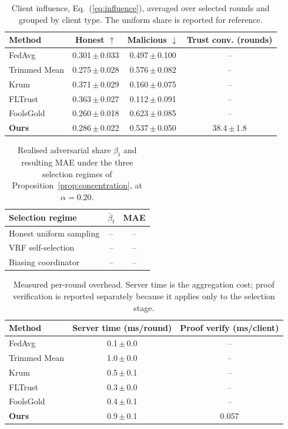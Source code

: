 \begin{table}[t]
\centering
\scriptsize
\caption{Client influence, Eq.~(\ref{eq:influence}), averaged over selected rounds and grouped by client type. The uniform share is reported for reference.}
\label{tab:trust_influence}
\setlength{\tabcolsep}{6pt}
\begin{tabular}{lccc}
\toprule
\textbf{Method} & \textbf{Honest $\uparrow$} & \textbf{Malicious $\downarrow$} & \textbf{Trust conv. (rounds)} \\
\midrule
FedAvg & 0.301\,$\pm$\,0.033 & 0.497\,$\pm$\,0.100 & -- \\
Trimmed Mean & 0.275\,$\pm$\,0.028 & 0.576\,$\pm$\,0.082 & -- \\
Krum & 0.371\,$\pm$\,0.029 & 0.160\,$\pm$\,0.075 & -- \\
FLTrust & 0.363\,$\pm$\,0.027 & 0.112\,$\pm$\,0.091 & -- \\
FoolsGold & 0.260\,$\pm$\,0.018 & 0.623\,$\pm$\,0.085 & -- \\
\textbf{Ours} & 0.286\,$\pm$\,0.022 & 0.537\,$\pm$\,0.050 & 38.4\,$\pm$\,1.8 \\
\bottomrule
\end{tabular}
\end{table}

\begin{table}[t]
\centering
\scriptsize
\caption{Realised adversarial share $\beta_t$ and resulting MAE under the three selection regimes of Proposition~\ref{prop:concentration}, at $\alpha=0.20$.}
\label{tab:selection}
\begin{tabular}{lcc}
\toprule
\textbf{Selection regime} & $\bar{\beta}_t$ & \textbf{MAE} \\
\midrule
Honest uniform sampling & -- & -- \\
VRF self-selection & -- & -- \\
Biasing coordinator & -- & -- \\
\bottomrule
\end{tabular}
\end{table}

\begin{table}[t]
\centering
\scriptsize
\caption{Measured per-round overhead. Server time is the aggregation cost; proof verification is reported separately because it applies only to the selection stage.}
\label{tab:overhead}
\setlength{\tabcolsep}{4pt}
\begin{tabular}{lcc}
\toprule
\textbf{Method} & \textbf{Server time (ms/round)} & \textbf{Proof verify (ms/client)} \\
\midrule
FedAvg & 0.1\,$\pm$\,0.0 & -- \\
Trimmed Mean & 1.0\,$\pm$\,0.0 & -- \\
Krum & 0.5\,$\pm$\,0.1 & -- \\
FLTrust & 0.3\,$\pm$\,0.0 & -- \\
FoolsGold & 0.4\,$\pm$\,0.1 & -- \\
\textbf{Ours} & 0.9\,$\pm$\,0.1 & 0.057 \\
\bottomrule
\end{tabular}
\end{table}

